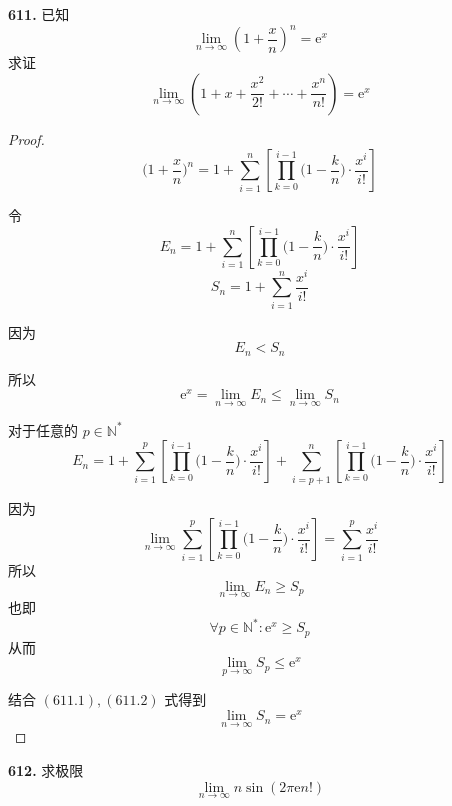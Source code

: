 \textbf{611.} 已知
\[\lim_{n \rightarrow \infty} \left(1 + \frac{x}{n}\right)^n = \mathrm{e}^x\]
求证
\[\lim_{n \rightarrow \infty} \left(1 + x + \frac{x^2}{2!} + \cdots + \frac{x^n}{n!}\right) = \mathrm{e}^x\]

\begin{proof}
    \[\biggl(1 + \frac{x}{n}\biggr)^n = 1 + \sum_{i=1}^{n} \left[\prod_{k=0}^{i-1}\biggl(1 - \frac{k}{n}\biggr) \cdot \frac{x^i}{i!}\right]\]

    令
    \[E_n = 1 + \sum_{i=1}^{n} \left[\prod_{k=0}^{i-1}\biggl(1 - \frac{k}{n}\biggr) \cdot \frac{x^i}{i!}\right]\]
    \[S_n = 1 + \sum_{i=1}^{n} \frac{x^i}{i!}\]

    因为
    \[E_n < S_n\]

    所以
    \[\mathrm{e}^x = \lim_{n \rightarrow \infty} E_n \leqslant \lim_{n \rightarrow \infty} S_n \tag{611.1}\]

    对于任意的 $p \in \mathbb{N}^*$
    \[E_n = 1 + \sum_{i=1}^{p} \left[\prod_{k=0}^{i-1} \biggl(1 - \frac{k}{n}\biggr) \cdot \frac{x^i}{i!}\right] + \sum_{i=p+1}^{n} \left[\prod_{k=0}^{i-1} \biggl(1 - \frac{k}{n}\biggr) \cdot \frac{x^i}{i!}\right]\]

    因为
    \[\lim_{n \rightarrow \infty} \sum_{i=1}^{p} \left[\prod_{k=0}^{i-1} \biggl(1 - \frac{k}{n}\biggr) \cdot \frac{x^i}{i!}\right] = \sum_{i=1}^{p} \frac{x^i}{i!}\]
    所以
    \[\lim_{n \rightarrow \infty} E_n \geqslant S_p\]
    也即
    \[\forall p \in \mathbb{N}^*: \mathrm{e}^x \geqslant S_p\]
    从而
    \[\lim_{p \rightarrow \infty} S_p \leqslant \mathrm{e}^x \tag{611.2}\]

    结合 $(611.1),(611.2)$ 式得到
    \[\lim_{n \rightarrow \infty} S_n = \mathrm{e}^x\]
\end{proof}\vspace{9pt}

\textbf{612.} 求极限
\[\lim_{n \rightarrow \infty} n \sin(2\pi\mathrm{e}n!)\]

